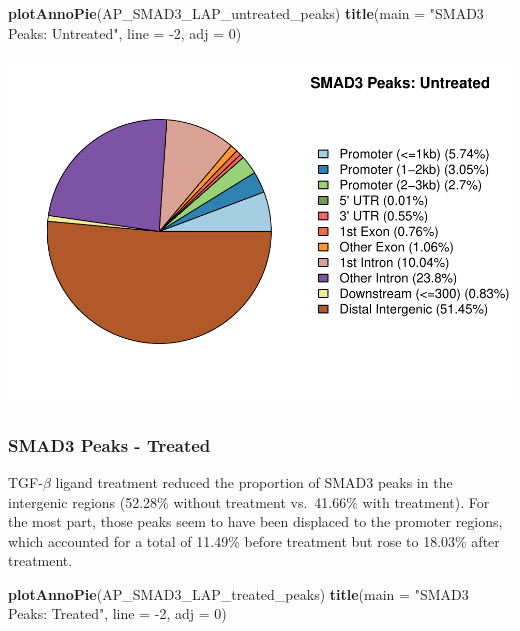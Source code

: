 \documentclass[]{article}
\newenvironment{Shaded}{\begin{snugshade}}{\end{snugshade}}
\newcommand{\DataTypeTok}[1]{\textcolor[rgb]{0.13,0.29,0.53}{#1}}
\newcommand{\DecValTok}[1]{\textcolor[rgb]{0.00,0.00,0.81}{#1}}
\newcommand{\KeywordTok}[1]{\textcolor[rgb]{0.13,0.29,0.53}{\textbf{#1}}}
\newcommand{\NormalTok}[1]{#1}
\newcommand{\StringTok}[1]{\textcolor[rgb]{0.31,0.60,0.02}{#1}}
\begin{document}
\begin{Shaded}
\begin{Highlighting}[]
\KeywordTok{plotAnnoPie}\NormalTok{(AP_SMAD3_LAP_untreated_peaks)}
\KeywordTok{title}\NormalTok{(}\DataTypeTok{main =} \StringTok{"SMAD3 Peaks: Untreated"}\NormalTok{, }\DataTypeTok{line =} \DecValTok{-2}\NormalTok{, }\DataTypeTok{adj =} \DecValTok{0}\NormalTok{)}
\end{Highlighting}
\end{Shaded}

\includegraphics{peak_annotation_go_term_analysis_files/figure-latex/unnamed-chunk-12-1.pdf}

\clearpage{}


\subsubsection{SMAD3 Peaks - Treated}

TGF-\(\beta\) ligand treatment reduced the proportion of SMAD3 peaks in
the intergenic regions (52.28\% without treatment vs.~41.66\% with
treatment). For the most part, those peaks seem to have been displaced
to the promoter regions, which accounted for a total of 11.49\% before
treatment but rose to 18.03\% after treatment.

\begin{Shaded}
\begin{Highlighting}[]
\KeywordTok{plotAnnoPie}\NormalTok{(AP_SMAD3_LAP_treated_peaks)}
\KeywordTok{title}\NormalTok{(}\DataTypeTok{main =} \StringTok{"SMAD3 Peaks: Treated"}\NormalTok{, }\DataTypeTok{line =} \DecValTok{-2}\NormalTok{, }\DataTypeTok{adj =} \DecValTok{0}\NormalTok{)}
\end{Highlighting}
\end{Shaded}
\end{document}
